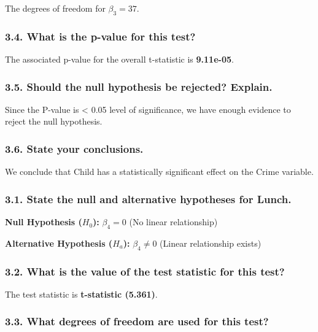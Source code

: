 \documentclass[
]{article}
\begin{document}
The degrees of freedom for \(\beta_3 = 37\).

\subsubsection{3.4. What is the p-value for this
test?}\label{what-is-the-p-value-for-this-test-3}

The associated p-value for the overall t-statistic is \textbf{9.11e-05}.

\subsubsection{3.5. Should the null hypothesis be rejected?
Explain.}\label{should-the-null-hypothesis-be-rejected-explain.-3}

Since the P-value is \textless{} 0.05 level of significance, we have
enough evidence to reject the null hypothesis.

\subsubsection{3.6. State your
conclusions.}\label{state-your-conclusions.-3}

We conclude that Child has a statistically significant effect on the
Crime variable.

\subsubsection{3.1. State the null and alternative hypotheses for
Lunch.}\label{state-the-null-and-alternative-hypotheses-for-lunch.}

\textbf{Null Hypothesis (\(H_0\)):} \(\beta_4 = 0\) (No linear
relationship)

\textbf{Alternative Hypothesis (\(H_a\)):} \(\beta_4 \neq 0\) (Linear
relationship exists)

\subsubsection{3.2. What is the value of the test statistic for this
test?}\label{what-is-the-value-of-the-test-statistic-for-this-test-4}

The test statistic is \textbf{t-statistic (5.361)}.

\subsubsection{3.3. What degrees of freedom are used for this
test?}\label{what-degrees-of-freedom-are-used-for-this-test-4}
\end{document}
